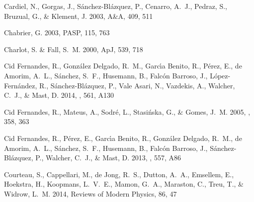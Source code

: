 \begin{thebibliography}
Cardiel, N., Gorgas, J., S{\'a}nchez-Bl{\'a}zquez, P., Cenarro, A.~J., Pedraz,
  S., Bruzual, G., \& Klement, J. 2003, A\&A, 409, 511
 \href{http://adsabs.harvard.edu/cgi-bin/nph-data_query?bibcode=2003A\%2526A..%
.409..511C&link_type=ABSTRACT}{\urllinklabel}

Chabrier, G. 2003, PASP, 115, 763
 \href{http://adsabs.harvard.edu/cgi-bin/nph-data_query?bibcode=2003PASP..115.%
.763C&link_type=ABSTRACT}{\urllinklabel}

Charlot, S. \& Fall, S.~M. 2000, ApJ, 539, 718
 \href{http://adsabs.harvard.edu/cgi-bin/nph-data_query?bibcode=2000ApJ...539.%
.718C&link_type=ABSTRACT}{\urllinklabel}

{Cid Fernandes}, R., {Gonz{\'a}lez Delgado}, R.~M., {Garc{\'{\i}}a Benito}, R.,
  {P{\'e}rez}, E., {de Amorim}, A.~L., {S{\'a}nchez}, S.~F., {Husemann}, B.,
  {Falc{\'o}n Barroso}, J., {L{\'o}pez-Fern{\'a}ndez}, R.,
  {S{\'a}nchez-Bl{\'a}zquez}, P., {Vale Asari}, N., {Vazdekis}, A., {Walcher},
  C.~J., \& {Mast}, D. 2014, \aap, 561, A130


{Cid Fernandes}, R., {Mateus}, A., {Sodr{\'e}}, L., {Stasi{\'n}ska}, G., \&
  {Gomes}, J.~M. 2005, \mnras, 358, 363


{Cid Fernandes}, R., {P{\'e}rez}, E., {Garc{\'{\i}}a Benito}, R., {Gonz{\'a}lez
  Delgado}, R.~M., {de Amorim}, A.~L., {S{\'a}nchez}, S.~F., {Husemann}, B.,
  {Falc{\'o}n Barroso}, J., {S{\'a}nchez-Bl{\'a}zquez}, P., {Walcher}, C.~J.,
  \& {Mast}, D. 2013, \aap, 557, A86


{Courteau}, S., {Cappellari}, M., {de Jong}, R.~S., {Dutton}, A.~A.,
  {Emsellem}, E., {Hoekstra}, H., {Koopmans}, L.~V.~E., {Mamon}, G.~A.,
  {Maraston}, C., {Treu}, T., \& {Widrow}, L.~M. 2014, Reviews of Modern
  Physics, 86, 47



\end{thebibliography}
